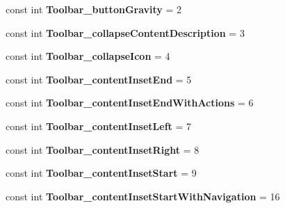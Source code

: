 \begin{DoxyCompactItemize}
const int {\bfseries Toolbar\+\_\+button\+Gravity} = 2
\item 
\mbox{\label{classst_delivery_1_1_resource_1_1_styleable_a5f1f59cc4a743c6bfe803357acfa7b6f}} 
const int {\bfseries Toolbar\+\_\+collapse\+Content\+Description} = 3
\item 
\mbox{\label{classst_delivery_1_1_resource_1_1_styleable_aa6200acce1c6fcbd1f81b9bedff94524}} 
const int {\bfseries Toolbar\+\_\+collapse\+Icon} = 4
\item 
\mbox{\label{classst_delivery_1_1_resource_1_1_styleable_a5d50fba58e6cf0d4e065c3ae57eff2d1}} 
const int {\bfseries Toolbar\+\_\+content\+Inset\+End} = 5
\item 
\mbox{\label{classst_delivery_1_1_resource_1_1_styleable_acdb0444addfadbc965a548abcfbd3680}} 
const int {\bfseries Toolbar\+\_\+content\+Inset\+End\+With\+Actions} = 6
\item 
\mbox{\label{classst_delivery_1_1_resource_1_1_styleable_af18a51217eaf301119232e9fe79b895d}} 
const int {\bfseries Toolbar\+\_\+content\+Inset\+Left} = 7
\item 
\mbox{\label{classst_delivery_1_1_resource_1_1_styleable_a00a70a5398a64e834bbec8bc006c2aea}} 
const int {\bfseries Toolbar\+\_\+content\+Inset\+Right} = 8
\item 
\mbox{\label{classst_delivery_1_1_resource_1_1_styleable_a9300554323ebc5fffc44b327fff02678}} 
const int {\bfseries Toolbar\+\_\+content\+Inset\+Start} = 9
\item 
\mbox{\label{classst_delivery_1_1_resource_1_1_styleable_ab6577bc852c965d26adf9648d96ddd02}} 
const int {\bfseries Toolbar\+\_\+content\+Inset\+Start\+With\+Navigation} = 16
\item 
\mbox{\label{classst_delivery_1_1_resource_1_1_styleable_a4b682e000744d0972c21f45739dc220a}} 

\end{DoxyCompactItemize}
